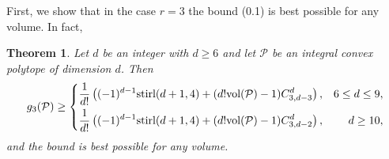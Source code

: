\documentclass[12pt]{amsart}
\newtheorem{theorem}{Theorem}[section]
\theoremstyle{definition}
\theoremstyle{remark}
\numberwithin{equation}{section}
\def\Pc{{\mathcal P}}
\begin{document}
First, we show that in the case $r=3$ the bound (0.1) is best possible for any volume.
In fact,
\begin{theorem}
	\label{3}
	Let $d$ be an integer with $d \geq 6$ and let $\Pc$ be an integral convex polytope of dimension $d$.
	Then
	\begin{displaymath}
	g _3(\Pc) \geq \left\{        
	\begin{aligned} 
	&\frac{1}{d!}\left((-1)^{d-1}\textnormal{stirl}(d+1,4)+(d!\textnormal{vol}(\Pc)-1)C^d_{3,d-3}\right) , & 6 \leq d \leq 9, \\
	&\frac{1}{d!}\left((-1)^{d-1}\textnormal{stirl}(d+1,4)+(d!\textnormal{vol}(\Pc)-1)C^d_{3,d-2}\right), & d \geq 10, \\
	\end{aligned}
	\right.
	\end{displaymath}
	and the bound is best possible for any volume.	
\end{theorem}
\end{document}
